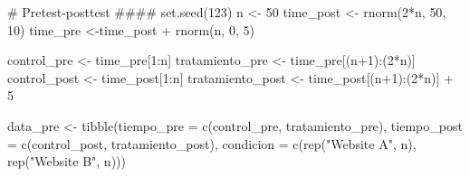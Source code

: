 \documentclass[
  letterpaper,
  DIV=11,
  numbers=noendperiod,
  oneside]{scrreprt}
\newenvironment{Shaded}{\begin{snugshade}}{\end{snugshade}}
\newcommand{\AttributeTok}[1]{\textcolor[rgb]{0.40,0.45,0.13}{#1}}
\newcommand{\CommentTok}[1]{\textcolor[rgb]{0.37,0.37,0.37}{#1}}
\newcommand{\DecValTok}[1]{\textcolor[rgb]{0.68,0.00,0.00}{#1}}
\newcommand{\FunctionTok}[1]{\textcolor[rgb]{0.28,0.35,0.67}{#1}}
\newcommand{\NormalTok}[1]{\textcolor[rgb]{0.00,0.23,0.31}{#1}}
\newcommand{\OtherTok}[1]{\textcolor[rgb]{0.00,0.23,0.31}{#1}}
\newcommand{\SpecialCharTok}[1]{\textcolor[rgb]{0.37,0.37,0.37}{#1}}
\newcommand{\StringTok}[1]{\textcolor[rgb]{0.13,0.47,0.30}{#1}}
\begin{document}
\begin{Shaded}
\begin{Highlighting}[]
\CommentTok{\# Pretest{-}posttest \#\#\#\#}
\FunctionTok{set.seed}\NormalTok{(}\DecValTok{123}\NormalTok{)}
\NormalTok{n }\OtherTok{\textless{}{-}} \DecValTok{50}
\NormalTok{time\_post }\OtherTok{\textless{}{-}} \FunctionTok{rnorm}\NormalTok{(}\DecValTok{2}\SpecialCharTok{*}\NormalTok{n, }\DecValTok{50}\NormalTok{, }\DecValTok{10}\NormalTok{)}
\NormalTok{time\_pre }\OtherTok{\textless{}{-}}\NormalTok{time\_post }\SpecialCharTok{+} \FunctionTok{rnorm}\NormalTok{(n,  }\DecValTok{0}\NormalTok{, }\DecValTok{5}\NormalTok{)}

\NormalTok{control\_pre  }\OtherTok{\textless{}{-}}\NormalTok{ time\_pre[}\DecValTok{1}\SpecialCharTok{:}\NormalTok{n] }
\NormalTok{tratamiento\_pre  }\OtherTok{\textless{}{-}}\NormalTok{ time\_pre[(n}\SpecialCharTok{+}\DecValTok{1}\NormalTok{)}\SpecialCharTok{:}\NormalTok{(}\DecValTok{2}\SpecialCharTok{*}\NormalTok{n)]}
\NormalTok{control\_post }\OtherTok{\textless{}{-}}\NormalTok{ time\_post[}\DecValTok{1}\SpecialCharTok{:}\NormalTok{n] }
\NormalTok{tratamiento\_post }\OtherTok{\textless{}{-}}\NormalTok{ time\_post[(n}\SpecialCharTok{+}\DecValTok{1}\NormalTok{)}\SpecialCharTok{:}\NormalTok{(}\DecValTok{2}\SpecialCharTok{*}\NormalTok{n)] }\SpecialCharTok{+} \DecValTok{5}

\NormalTok{data\_pre }\OtherTok{\textless{}{-}} \FunctionTok{tibble}\NormalTok{(}\AttributeTok{tiempo\_pre =} \FunctionTok{c}\NormalTok{(control\_pre, tratamiento\_pre),}
                   \AttributeTok{tiempo\_post =} \FunctionTok{c}\NormalTok{(control\_post, tratamiento\_post),}
                   \AttributeTok{condicion =} \FunctionTok{c}\NormalTok{(}\FunctionTok{rep}\NormalTok{(}\StringTok{"Website A"}\NormalTok{, n), }\FunctionTok{rep}\NormalTok{(}\StringTok{"Website B"}\NormalTok{, n)))}


\end{Highlighting}
\end{Shaded}
\end{document}
